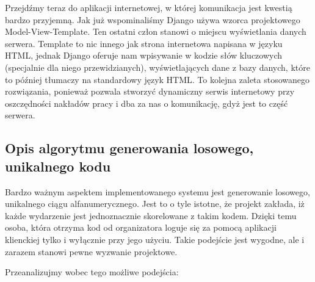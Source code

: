 \documentclass[12pt,titlepage]{article}
\begin{document}
Przejdźmy teraz do aplikacji internetowej, w której komunikacja jest kwestią bardzo przyjemną. Jak już wspominaliśmy Django używa wzorca projektowego Model-View-Template. 
Ten ostatni człon stanowi o miejscu wyświetlania danych serwera. Template to nic innego jak strona internetowa napisana w języku HTML, jednak Django oferuje nam wpisywanie 
w kodzie słów kluczowych (specjalnie dla niego przewidzianych), wyświetlających dane z bazy danych, które to później tłumaczy na standardowy język HTML. 
To kolejna zaleta stosowanego rozwiązania, ponieważ pozwala stworzyć dynamiczny serwis internetowy przy oszczędności nakładów pracy i dba za nas o komunikację, gdyż jest to część serwera.

\subsection{Opis algorytmu generowania losowego, unikalnego kodu}
Bardzo ważnym aspektem implementowanego systemu jest generowanie losowego, unikalnego ciągu alfanumerycznego. Jest to o tyle istotne, że projekt zakłada, iż każde wydarzenie jest jednoznacznie
skorelowane z takim kodem. Dzięki temu osoba, która otrzyma kod od organizatora loguje się za pomocą aplikacji klienckiej tylko i wyłącznie przy jego użyciu. Takie podejście jest wygodne,
ale i zarazem stanowi pewne wyzwanie projektowe.

Przeanalizujmy wobec tego możliwe podejścia:
\end{document}

